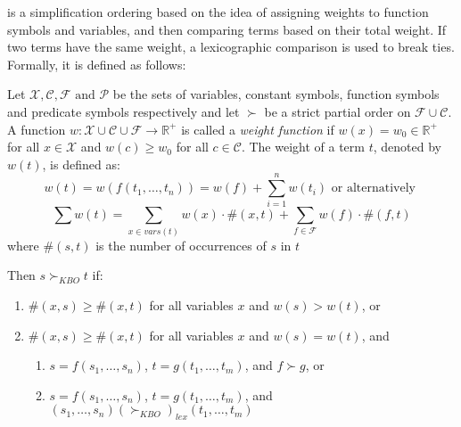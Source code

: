  is a simplification ordering based on the idea of assigning weights to function symbols and variables, and then comparing terms based on their total weight. If two terms have the same weight, a lexicographic comparison is used to break ties.
Formally, it is defined as follows:
\begin{definition}
  Let \(\mathcal{X},\mathcal{C},\mathcal{F} \text{ and } \mathcal{P}\) be the sets of variables, constant symbols, function symbols and predicate symbols respectively and let \(\succ\) be a strict partial order on \(\mathcal{F} \cup \mathcal{C}\).
  A function \(w: \mathcal{X} \cup \mathcal{C} \cup \mathcal{F} \to \mathbb{R}^+\) is called a \emph{weight function} if \(w(x) = w_0 \in \mathbb{R}^+\) for all \(x \in \mathcal{X}\) and \(w(c) \geq w_0\) for all \(c \in \mathcal{C}\).
  The weight of a term \(t\), denoted by \(w(t)\), is defined as:
  \[
  w(t) = w(f(t_1,\ldots,t_n)) = w(f) + \sum_{i=1}^n w(t_i) \text{ or alternatively }
  \]
  \[
  \sum w(t) = \sum_{x \in vars(t)} w(x) \cdot \#(x,t) + \sum_{f \in \mathcal{F}} w(f) \cdot \#(f,t)
  \]
  where \(\#(s,t)\) is the number of occurrences of \(s\) in \(t\)

  Then \(s \succ_{KBO} t\) if:
  \begin{enumerate}
    \item \(\#(x,s) \geq \#(x,t)\) for all variables \(x\) and \(w(s) > w(t)\), or
    \item \(\#(x,s) \geq \#(x,t)\) for all variables \(x\) and \(w(s) = w(t)\), and
          \begin{enumerate}
            \item \(s = f(s_1,\ldots,s_n)\), \(t = g(t_1,\ldots,t_m)\), and \(f \succ g\), or
            \item \(s = f(s_1,\ldots,s_n)\), \(t = g(t_1,\ldots,t_m)\), and \((s_1, \ldots, s_n) {(\succ_{KBO})}_{lex} (t_1, \ldots, t_m)\)
          \end{enumerate}
  \end{enumerate}
\end{definition}

